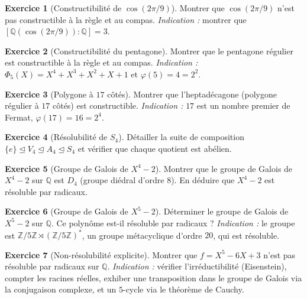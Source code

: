 \documentclass[12pt,a4paper,openany]{book}
\theoremstyle{definition}
\newtheorem{exercice}{Exercice}[chapter]
\newcommand{\Z}{\mathbb{Z}}
\newcommand{\Q}{\mathbb{Q}}
\begin{document}
\begin{exercice}[Constructibilité de $\cos(2\pi/9)$]\label{exo:cos-2pi-9}
Montrer que $\cos(2\pi/9)$ n'est pas constructible à la règle et au compas.
\emph{Indication :} montrer que $[\Q(\cos(2\pi/9)):\Q] = 3$.
\end{exercice}

\begin{exercice}[Constructibilité du pentagone]\label{exo:pentagone}
Montrer que le pentagone régulier est constructible à la règle et au compas.
\emph{Indication :} $\Phi_5(X) = X^4 + X^3 + X^2 + X + 1$ et
$\varphi(5) = 4 = 2^2$.
\end{exercice}

\begin{exercice}[Polygone à $17$ côtés]\label{exo:heptadecagone}
Montrer que l'heptadécagone (polygone régulier à $17$ côtés) est constructible.
\emph{Indication :} $17$ est un nombre premier de Fermat, $\varphi(17) = 16 = 2^4$.
\end{exercice}

\begin{exercice}[Résolubilit\'e de $S_4$]\label{exo:resolubilite-S4}
Détailler la suite de composition
$\{e\} \trianglelefteq V_4 \trianglelefteq A_4 \trianglelefteq S_4$
et vérifier que chaque quotient est abélien.
\end{exercice}

\begin{exercice}[Groupe de Galois de $X^4 - 2$]\label{exo:galois-X4-2}
Montrer que le groupe de Galois de $X^4 - 2$ sur $\Q$ est $D_4$ (groupe
diédral d'ordre $8$). En déduire que $X^4 - 2$ est résoluble par radicaux.
\end{exercice}

\begin{exercice}[Groupe de Galois de $X^5 - 2$]\label{exo:galois-X5-2}
Déterminer le groupe de Galois de $X^5 - 2$ sur $\Q$. Ce polynôme est-il
résoluble par radicaux ?
\emph{Indication :} le groupe est $\Z/5\Z \rtimes (\Z/5\Z)^*$, un groupe
métacyclique d'ordre $20$, qui est résoluble.
\end{exercice}

\begin{exercice}[Non-résolubilit\'e explicite]\label{exo:non-resolubilite}
Montrer que $f = X^5 - 6X + 3$ n'est pas résoluble par radicaux sur $\Q$.
\emph{Indication :} vérifier l'irréductibilité (Eisenstein), compter les
racines réelles, exhiber une transposition dans le groupe de Galois via la
conjugaison complexe, et un $5$-cycle via le théorème de Cauchy.
\end{exercice}
\end{document}
